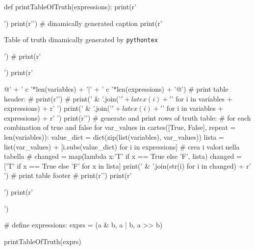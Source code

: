 \documentclass[a4paper]{article}
\begin{document}
\begin{sympycode}
def printTableOfTruth(expressions):
	print(r'\begin{table}[h]')
	print(r'\centering')
	# dinamically generated caption
	print(r'\caption{Table of truth dinamically generated by \texttt{pythontex}}')
	# print(r'\caption{' + ', '.join('\(' + latex(i) + '\)' for i in expressions) + '}')
	print(r'\begin{tabular}{@{}' + ' c '*len(variables) + '|' + ' c '*len(expressions) + '@{}}')
	# print table header:
	# print(r'\toprule')
	# print(' & '.join('\(' + latex(i) + '\)' for i in variables + expressions) + r' \tabularnewline')
	print(' & '.join('\(' + latex(i) + '\)' for i in variables + expressions) + r' \tabularnewline')
	print(r'\hline')
	# generate and print rows of truth table:
	# for each combination of true and false
	for var_values in cartes([True, False], repeat = len(variables)):
		value_dict = dict(zip(list(variables), var_values))
		lista = list(var_values) + [i.subs(value_dict) for i in expressions]
		# crea i valori nella tabella
		# changed = map(lambda x:'T' if x == True else 'F', lista)
		changed = ['T' if x == True else 'F' for x in lista]
		print(' & '.join(str(i) for i in changed) + r' \tabularnewline')
	# print table footer
	# print(r'\bottomrule')
	print(r'\end{tabular}')
	print(r'\end{table}')
\end{sympycode}

\begin{sympycode}
# define expressions:
exprs = (a & b, a | b, a >> b)

printTableOfTruth(exprs)
\end{sympycode}
\end{document}
